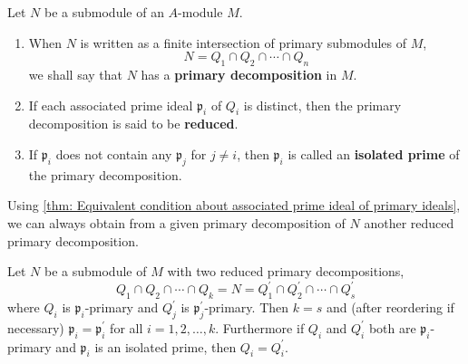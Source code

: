 \begin{definition}
    Let $N$ be a submodule of an $A$-module $M$.
    \begin{enumerate}
        \item
              When $N$ is written as a finite intersection of primary submodules of $M$,
              \begin{equation*}
                  N=Q_1 \cap Q_2 \cap \cdots \cap Q_n
              \end{equation*}
              we shall say that $N$ has a \textbf{primary decomposition} in $M$.
        \item
              If each associated prime ideal $\mathfrak{p}_i$ of $Q_i$ is distinct, then the primary decomposition is said to be \textbf{reduced}.
        \item
              If $\mathfrak{p}_i$ does not contain any $\mathfrak{p}_j$ for $j \neq i$, then $\mathfrak{p}_i$ is called an \textbf{isolated prime} of the primary decomposition.
    \end{enumerate}
    \begin{remark}
        Using \ref{thm: Equivalent condition about associated prime ideal of primary ideals}, we can always obtain  from a given primary decomposition of $N$ another  reduced primary decomposition.
    \end{remark}
\end{definition}



\begin{theorem}
    \label{thm: Uniqueness of reduced primary decomposition}
    Let $N$ be a submodule of $M$ with two reduced primary decompositions,
    \begin{equation*}
        Q_1 \cap Q_2 \cap \cdots \cap Q_k=N
        =
        Q_1^{\prime} \cap Q_2^{\prime} \cap \cdots \cap Q_{s}^{\prime}
    \end{equation*}
    where $Q_i$ is $\mathfrak{p}_i$-primary and $Q_{j}^{\prime}$ is $\mathfrak{p}_j^{\prime}$-primary.
    Then $k=s$ and (after reordering if necessary) $\mathfrak{p}_i=\mathfrak{p}_i^{\prime}$ for all $i=1,2, \ldots, k$.
    Furthermore if $Q_{i}$ and $Q_i^{\prime}$ both are $\mathfrak{p}_i$-primary and $\mathfrak{p}_i$ is an isolated prime, then $Q_{i}=Q_{i}^{\prime}$.
\end{theorem}


